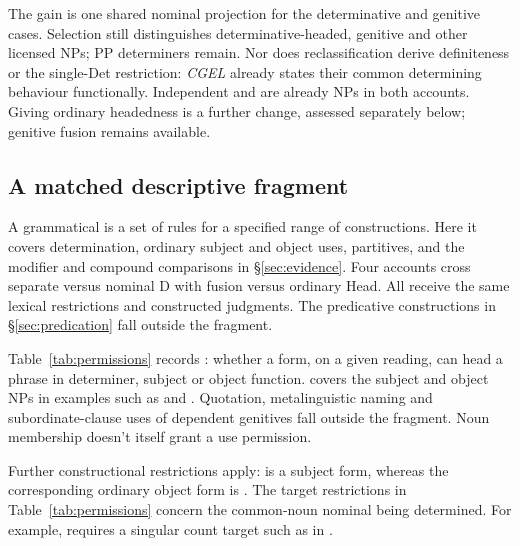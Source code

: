 \documentclass[12pt]{article}
\begin{document}
The gain is one shared nominal projection for the determinative and genitive cases. Selection still distinguishes determinative-headed, genitive and other licensed NPs; PP determiners remain. Nor does reclassification derive definiteness or the single-Det restriction: \textit{CGEL} already states their common determining behaviour functionally. Independent  and  are already NPs in both accounts. Giving  ordinary headedness is a further change, assessed separately below; genitive fusion remains available.

\subsection{A matched descriptive fragment}\label{sec:fragment}

A grammatical  is a set of rules for a specified range of constructions. Here it covers determination, ordinary subject and object uses, partitives, and the modifier and compound comparisons in §\ref{sec:evidence}. Four accounts cross separate versus nominal D with fusion versus ordinary Head. All receive the same lexical restrictions and constructed judgments. The predicative constructions in §\ref{sec:predication} fall outside the fragment.

Table~\ref{tab:permissions} records : whether a form, on a given reading, can head a phrase in determiner, subject or object function.  covers the subject and object NPs in examples such as  and . Quotation, metalinguistic naming and subordinate-clause uses of dependent genitives fall outside the fragment. Noun membership doesn't itself grant a use permission.

Further constructional restrictions apply:  is a subject form, whereas the corresponding ordinary object form is . The target restrictions in Table~\ref{tab:permissions} concern the common-noun nominal being determined. For example,  requires a singular count target such as  in .
\end{document}
